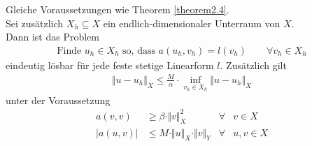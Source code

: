 \begin{theorem}\label{theorem2.5}
	Gleiche Voraussetzungen wie Theorem \ref{theorem2.4}.\\
	Sei zusätzlich $X_h\subseteq X$ ein endlich-dimensionaler Unterraum von $X$.\\
	Dann ist das Problem
	\begin{align*}
		\text{Finde }u_h\in X_h\text{ so, dass }
		a(u_h,v_h)=l(v_h)\qquad\forall v_h\in X_h
	\end{align*}
	eindeutig lösbar für jede feste stetige Linearform $l$.
	Zusätzlich gilt
	\begin{align*}
		\Vert u-u_h\Vert_X\leq\frac{M}{\alpha}\cdot\inf\limits_{v_h\in X_h}\Vert u-u_h\Vert_X
	\end{align*}
	unter der Voraussetzung
	\begin{align*}
		a(v,v)&\geq\beta\cdot\Vert v\Vert^2_X &\forall& v\in X\\
		\big|a(u,v)\big|&\leq M\cdot\Vert u\Vert_X\cdot\Vert v\Vert_Y &\forall& u,v\in X
	\end{align*}
\end{theorem}
